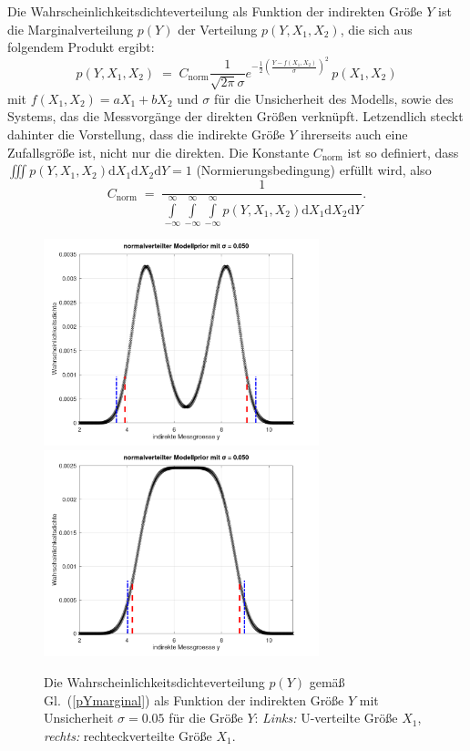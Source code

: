 Die Wahrscheinlichkeitsdichteverteilung als Funktion der indirekten Größe $Y$ ist
die Marginalverteilung $p(Y)$ der Verteilung $p(Y,X_1,X_2)$, die sich aus folgendem Produkt ergibt:
\begin{equation}
p(Y,X_1,X_2) \; = \; C_\mathrm{norm} 
\frac{1}{\sqrt{2\pi} \sigma} e^{-\frac{1}{2}\left(\frac{Y - f(X_1, X_2)}{\sigma}\right)^2}
\, p(X_1,X_2) 
\end{equation}
mit $f(X_1, X_2) = a X_1 + b X_2$ und $\sigma$ für die Unsicherheit des Modells, sowie des
Systems, das die Messvorgänge der direkten Größen verknüpft. Letzendlich steckt dahinter
die Vorstellung, dass die indirekte Größe $Y$ ihrerseits auch eine Zufallsgröße ist, nicht nur
die direkten. Die Konstante $C_\mathrm{norm}$ ist so definiert, dass 
$\iiint p(Y,X_1,X_2) \mathrm{d}X_1 \mathrm{d}X_2 \mathrm{d}Y = 1$ (Normierungsbedingung) erfüllt wird, also
\begin{equation}
C_\mathrm{norm} \; = \; \frac{1}{\int\limits_{-\infty}^{\infty} \int\limits_{-\infty}^{\infty}
	\int\limits_{-\infty}^{\infty} p(Y,X_1,X_2) \mathrm{d}X_1 \mathrm{d}X_2 \mathrm{d}Y } .
\end{equation}

\begin{figure}
	\begin{center}
	\includegraphics[width=80mm]{10_vorlesung/media/indirekte_y_modellGauss_sigma0p050.png}
		\hspace{2mm}
	\includegraphics[width=80mm]{10_vorlesung/media/indirekte_y_modellGauss_sigma0p050_box.png}
		\caption{Die Wahrscheinlichkeitsdichteverteilung $p(Y)$ gemäß Gl.~(\ref{pYmarginal}) als Funktion der
			indirekten Größe $Y$ mit Unsicherheit $\sigma = 0.05$ für die Größe $Y$:
			\textsl{Links:} U-verteilte Größe $X_1$,
			\textsl{rechts:} rechteckverteilte Größe $X_1$.}
		\label{pdfYsigma}
	\end{center}
\end{figure}

